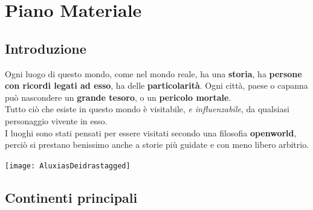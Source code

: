 \documentclass[10pt,twoside,onecolumn,openany]{book}
\begin{document}
\chapter{Piano Materiale}
\section{Introduzione}
Ogni luogo di questo mondo, come nel mondo reale, ha una \textbf{storia}, ha \textbf{persone con ricordi legati ad esso}, ha delle \textbf{particolarità}. Ogni città, paese o capanna può nascondere un \textbf{grande tesoro}, o un \textbf{pericolo mortale}. \\
Tutto ciò che esiste in questo mondo è visitabile, \emph{e influenzabile}, da qualsiasi personaggio vivente in esso. \\
I luoghi sono stati pensati per essere visitati secondo una filosofia \textbf{openworld}, perciò si prestano benissimo anche a storie più guidate e con meno libero arbitrio.\\
\begin{center}
\texttt{[image: AluxiasDeidrastagged]}
\end{center}
\newpage
\section{Continenti principali}
\end{document}
